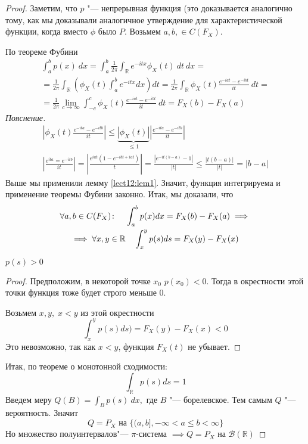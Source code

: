 \begin{proof}
    Заметим, что $p$ "--- непрерывная функция (это доказывается аналогично тому, как мы доказывали аналогичное утверждение для характеристической функции, когда вместо $\phi$ было $P$. Возьмем $a, b, \in C(F_X)$. 

    По теореме Фубини
    \begin{multline*}
        \int_a^b p(x)\: dx = \int_a^b \frac{1}{2\pi}\int_\mathbb{R} e^{-itx}\phi_X(t)\:dt\: dx =\\= \frac{1}{2\pi}\int_\mathbb{R}\left(\phi_X(t) \int_a^b e^{-itx} dx\right)dt =
        \frac{1}{2\pi} \int_\mathbb{R} \phi_X(t) \frac{e^{-iat} - e^{-ibt}}{it}\:dt =\\= \frac{1}{2\pi}\lim_{c\to \infty} \int_{-c}^c \phi_X(t) \frac{e^{-iat} - e^{-ibt}}{it}\:dt = F_X(b) - F_X(a)
    \end{multline*}
    \emph{Пояснение.} 
\begin{gather*}
    \left|\phi_X(t) \frac{e^{-ita} - e^{-itb}}{it} \right| \leqslant \underbrace{|\phi_X(t)|}_{\leqslant 1} \left|\frac{e^{-ita} - e^{-itb}}{it}\right|\\
    \left|\frac{e^{ita} = e^{-itb}}{it}\right| = \left|\frac{e^{iat} (1 - e^{-ibt + iat})}{t}\right| = \frac{\left|e^{-it(b-a)} - 1\right|}{|t|}  \leqslant \frac{|t(b-a)|}{|t|} = |b-a|
\end{gather*}
Выше мы применили  лемму \ref{lect12:lem1}. Значит, функция интегрируема и применение теоремы Фубини законно.
Итак, мы доказали, что
\begin{multline*}
    \forall a, b \in C(F_X)\colon \quad \int_a^b p(x) dx = F_X(b) - F_X(a) \implies\\\implies \forall x, y \in \mathbb{R}\quad \int_x^y p(s) ds = F_X(y) - F_X(x)
\end{multline*}
\begin{nb}
     $p(s) > 0$
     \begin{proof}
         Предположим, в некоторой точке $x_0$ $p(x_0) < 0$. Тогда в окрестности этой точки функция тоже будет строго меньше 0.

         Возьмем $x, y, \; x < y$ из этой окрестности
         $$\int_x^y p(s) ds) = F_X(y) -F_X(x) < 0$$
         Это невозможно, так как $x < y$, функция $F_X(t)$ не убывает.
     \end{proof}
 \end{nb}
Итак, по теореме о монотонной сходимости:
$$\int_\mathbb{R} p(s) ds = 1$$
Введем меру $Q(B)=\int_Bp(s) \:dx,$ где $B$ "--- борелевское. Тем самым $Q$ "--- вероятность. Значит
$$Q = P_X \mbox{ на } \{(a, b], -\infty < a \leqslant b < \infty\} $$
Но множество полуинтервалов"--- $\pi$-система $\implies Q = P_X$ на $\mathcal{B}(\mathbb{R})$
\end{proof}
